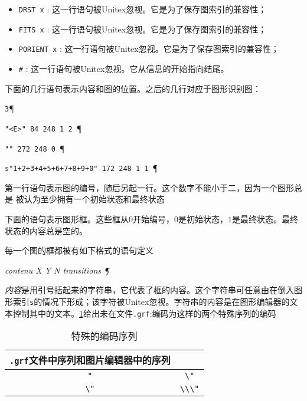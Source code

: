 \begin{itemize}
  \item \verb+DRST x+ : 
  这一行语句被Unitex忽视。它是为了保存图索引的兼容性；

  \item \verb+FITS x+ :
  这一行语句被Unitex忽视。它是为了保存图索引的兼容性；
  \item \verb+PORIENT x+ : 这一行语句被Unitex忽视。它是为了保存图索引的兼容性；

  \item \verb+#+ : 
  这一行语句被Unitex忽视。它从信息的开始指向结尾。
  

\end{itemize}

\bigskip
\noindent
下面的几行语句表示内容和图的位置。之后的几行对应于图形识别图：



\bigskip
\verb+3+\P

\verb+"<E>" 84 248 1 2 +\P

\verb+"" 272 248 0 +\P

\verb$s"1+2+3+4+5+6+7+8+9+0" 172 248 1 1 $\P

\bigskip
\noindent
第一行语句表示图的编号，随后另起一行。这个数字不能小于二，因为一个图形总是
被认为至少拥有一个初始状态和最终状态


\bigskip
\noindent 
下面的语句表示图形框。这些框从$0$开始编号，$0$是初始状态，$1$是最终状态。最终状态的内容总是空的。



\bigskip
\noindent
每一个图的框都被有如下格式的语句定义




\bigskip
\textit{contenu X Y N transitions \P}

\bigskip
\noindent \textit{内容}是用引号括起来的字符串，它代表了框的内容。这个字符串可任意由在倒入图形索引\verb+s+的情况下形成；该字符被Unitex忽视。字符串的内容是在图形编辑器的文本控制其中的文本。\ref{table10-2}给出未在文件\verb+.grf+:编码为这样的两个特殊序列的编码



\bigskip
\begin{table}[h]
\begin{center}
\begin{tabular}{|c|c|}
\hline
 \verb+.grf+文件中序列和图片编辑器中的序列


\\
\hline
\verb$"$ & \verb$\"$
\\
\hline
\verb$\"$ & \verb$\\\"$
\\
\hline
\end{tabular}
\caption{特殊的编码序列\label{table10-2}}
\end{center}
\end{table}

